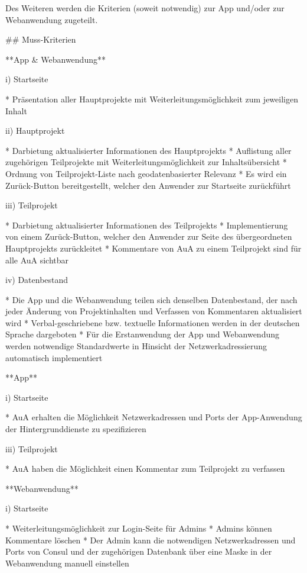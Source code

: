 \begin{markdown}
  
Des Weiteren werden die Kriterien (soweit notwendig) zur App und/oder zur Webanwendung zugeteilt.

## Muss-Kriterien

**App & Webanwendung**

i) Startseite

* Präsentation aller Hauptprojekte mit Weiterleitungsmöglichkeit zum jeweiligen Inhalt

ii) Hauptprojekt

* Darbietung aktualisierter Informationen des Hauptprojekts
* Auflistung aller zugehörigen Teilprojekte mit Weiterleitungsmöglichkeit zur Inhaltsübersicht
* Ordnung von Teilprojekt-Liste nach geodatenbasierter Relevanz
* Es wird ein Zurück-Button bereitgestellt, welcher den Anwender zur Startseite zurückführt

iii) Teilprojekt

* Darbietung aktualisierter Informationen des Teilprojekts
* Implementierung von einem Zurück-Button, welcher den Anwender zur Seite des übergeordneten Hauptprojekts zurückleitet
* Kommentare von AuA zu einem Teilprojekt sind für alle AuA sichtbar

iv) Datenbestand

* Die App und die Webanwendung teilen sich denselben Datenbestand, der nach jeder Änderung von Projektinhalten und Verfassen von Kommentaren aktualisiert wird
* Verbal-geschriebene bzw. textuelle Informationen werden in der deutschen Sprache dargeboten
* Für die Erstanwendung der App und Webanwendung werden notwendige Standardwerte in Hinsicht der Netzwerkadressierung automatisch implementiert

**App**

i) Startseite

* AuA erhalten die Möglichkeit Netzwerkadressen und Ports der App-Anwendung der Hintergrunddienste zu spezifizieren

iii) Teilprojekt

* AuA haben die Möglichkeit einen Kommentar zum Teilprojekt zu verfassen

**Webanwendung**

i) Startseite

* Weiterleitungsmöglichkeit zur Login-Seite für Admins
* Admins können Kommentare löschen
* Der Admin kann die notwendigen Netzwerkadressen und Ports von Consul und der zugehörigen Datenbank über eine Maske in der Webanwendung manuell einstellen


\end{markdown}
